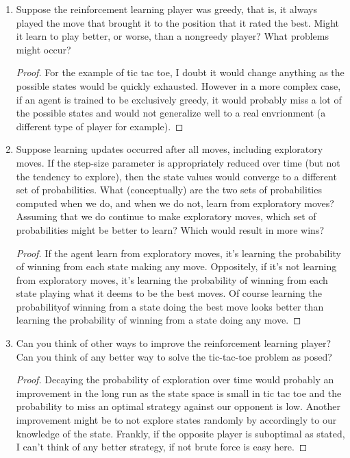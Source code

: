 \documentclass[]{book}
\theoremstyle{definition}
\begin{document}
\begin{enumerate}
    \item Suppose the reinforcement learning player was greedy, that is, it always played the move that brought it to the position that it rated the best. Might it learn to play better, or worse, than a nongreedy player? What problems might occur?
    \begin{proof}
        For the example of tic tac toe, I doubt it would change anything as the possible states would be quickly exhausted. However in a more complex case, if an agent is trained to be exclusively greedy, it would probably miss a lot of the possible states and would not generalize well to a real envrionment (a different type of player for example).
    \end{proof}

    \item Suppose learning updates occurred after all moves, including exploratory moves. If the step-size parameter is appropriately reduced over time (but not the tendency to explore), then the state values would converge to a different set of probabilities. What (conceptually) are the two sets of probabilities computed when we do, and when we do not, learn from exploratory moves? Assuming that we do continue to make exploratory moves, which set of probabilities might be better to learn? Which would result in more wins?
    \begin{proof}
        If the agent learn from exploratory moves, it's learning the probability of winning from each state making any move. Oppositely, if it's not learning from exploratory moves, it's learning the probability of winning from each state playing what it deems to be the best moves. Of course learning the probabilityof winning from a state doing the best move looks better than learning the probability of winning from a state doing any move.
    \end{proof}

    \item Can you think of other ways to improve the reinforcement learning player? Can you think of any better way to solve the tic-tac-toe problem as posed?
    \begin{proof}
        Decaying the probability of exploration over time would probably an improvement in the long run as the state space is small in tic tac toe and the probability to miss an optimal strategy against our opponent is low. Another improvement might be to not explore states randomly by accordingly to our knowledge of the state. Frankly, if the opposite player is suboptimal as stated, I can't think of any better strategy, if not brute force is easy here.
    \end{proof}
\end{enumerate}
\end{document}
